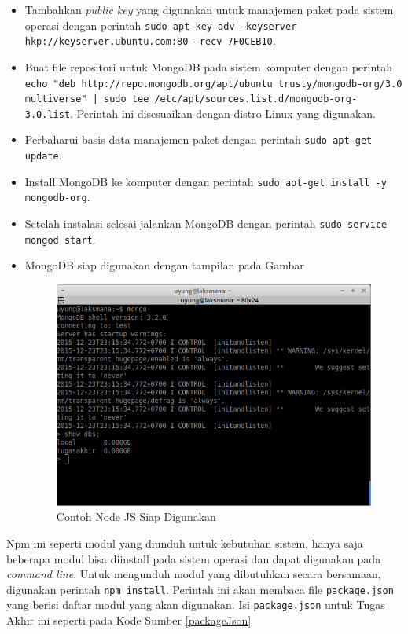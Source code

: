 \documentclass{ta-its}
\begin{document}
				\begin{itemize}
					\item Tambahkan \textit{public key} yang digunakan untuk manajemen paket pada sistem operasi dengan perintah \texttt{sudo apt-key adv --keyserver hkp://keyserver.ubuntu.com:80 --recv 7F0CEB10}.
					\item Buat file repositori untuk MongoDB pada sistem komputer dengan perintah \texttt{echo "deb http://repo.mongodb.org/apt/ubuntu trusty/mongodb-org/3.0 multiverse" | sudo tee /etc/apt/sources.list.d/mongodb-org-3.0.list}. Perintah ini disesuaikan dengan distro Linux yang digunakan.
					\item Perbaharui basis data manajemen paket dengan perintah \texttt{sudo apt-get update}.
					\item Install MongoDB ke komputer dengan perintah \texttt{sudo apt-get install -y mongodb-org}.
					\item Setelah instalasi selesai jalankan MongoDB dengan perintah \texttt{sudo service mongod start}.
					\item MongoDB siap digunakan dengan tampilan pada Gambar
					\begin{figure}[h] %
						\centering
						\includegraphics[width=\linewidth]{contoh_img/cekmongodb}
						\caption{Contoh Node JS Siap Digunakan}
						\label{gambarCekMongoDB}
					\end{figure}
					
				\end{itemize}
				
				
			
			Npm ini seperti modul yang diunduh untuk kebutuhan sistem, hanya saja beberapa modul bisa diinstall pada sistem operasi dan dapat digunakan pada \textit{command line}. 
			Untuk mengunduh modul yang dibutuhkan secara bersamaan, digunakan perintah \texttt{npm install}. Perintah ini akan membaca file \texttt{package.json} yang berisi daftar modul yang akan digunakan. Isi \texttt{package.json} untuk Tugas Akhir ini seperti pada Kode Sumber \ref{packageJson}
\end{document}
